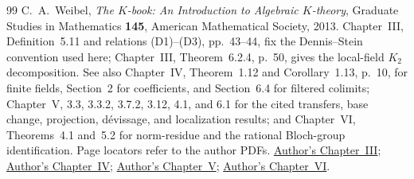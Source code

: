 \documentclass[11pt,a4paper]{amsart}
\numberwithin{equation}{section}
\theoremstyle{definition}
\theoremstyle{remark}
\begin{document}
\begin{thebibliography}{99}
C.~A.~Weibel, \emph{The $K$-book: An Introduction to Algebraic $K$-theory}, Graduate Studies in Mathematics \textbf{145}, American Mathematical Society, 2013.
Chapter~III, Definition~5.11 and relations (D1)--(D3), pp.~43--44,
fix the Dennis--Stein convention used here; Chapter~III,
Theorem~6.2.4, p.~50, gives the local-field $K_2$ decomposition.
See also Chapter~IV, Theorem~1.12 and Corollary~1.13, p.~10,
for finite fields, Section~2 for coefficients, and Section~6.4
for filtered colimits; Chapter~V, 3.3, 3.3.2, 3.7.2, 3.12,
4.1, and 6.1 for the cited transfers, base change, projection,
d\'evissage, and localization results; and Chapter~VI,
Theorems~4.1 and~5.2 for norm-residue and the rational
Bloch-group identification. Page locators refer to the author PDFs.
\href{https://sites.math.rutgers.edu/~weibel/Kbook/Kbook.III.pdf}{Author's Chapter~III};
\href{https://sites.math.rutgers.edu/~weibel/Kbook/Kbook.IV.pdf}{Author's Chapter~IV};
\href{https://sites.math.rutgers.edu/~weibel/Kbook/Kbook.V.pdf}{Author's Chapter~V};
\href{https://sites.math.rutgers.edu/~weibel/Kbook/Kbook.VI.pdf}{Author's Chapter~VI}.
\end{thebibliography}

\end{document}
